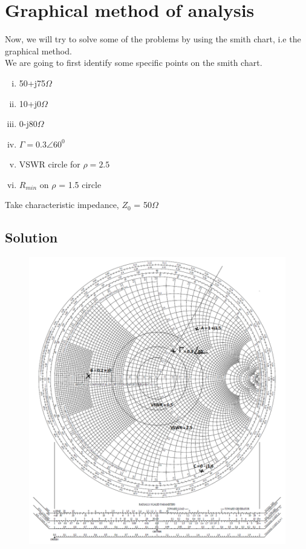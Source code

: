 \section{Graphical method of analysis}
\begin{example}
Now, we will try to solve some of the problems by using the smith chart, i.e the graphical method.\\
We are going to first identify some specific points on the smith chart.
\begin{enumerate}[(i)]
\item 50+j75$\Omega$
\item 10+j0$\Omega$
\item 0-j80$\Omega$
\item $\Gamma=0.3\angle60^{0}$
\item VSWR circle for $\rho=2.5$
\item $R_{min}$ on $\rho$ = 1.5  circle
\end{enumerate}
Take characteristic impedance, $Z_{0}$ = 50$\Omega$

\subsection*{Solution}
\begin{figure}[h]
\includegraphics[width=1\linewidth]{"./graphics/Smith chart"}
\end{figure}


\end{example}
